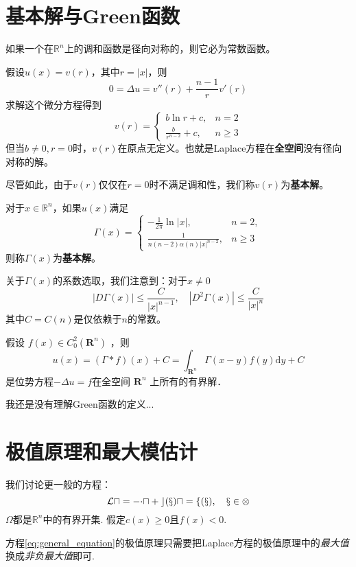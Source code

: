 \documentclass{mynote}
\begin{document}
\section{基本解与Green函数}

\begin{proposition}
    如果一个在$\mathbb{R}^n$上的调和函数是径向对称的，则它必为常数函数。
\end{proposition}
假设$u(x)=v(r)$，其中$r=|x|$，则
\[
    0=\Delta u =v''(r)+\frac{n-1}{r}v'(r)
\]
求解这个微分方程得到
\[
    v(r)=\left\{\begin{array}{cl}
        b \ln r+c, & n=2 \\
        \frac{b}{r^{n-2}}+c, & n \geq 3
        \end{array}\right.
\]
但当$b\ne 0,r=0$时，$v(r)$在原点无定义。也就是Laplace方程在\textbf{全空间}没有径向对称的解。

尽管如此，由于$v(r)$仅仅在$r=0$时不满足调和性，我们称$v(r)$为\textbf{基本解}。
\begin{definition}
    对于$x\in \mathbb{R}^n$，如果$u(x)$满足
    \[
        \Gamma(x)= \begin{cases}-\frac{1}{2 \pi} \ln |x|, & n=2, \\ \frac{1}{n(n-2) \alpha(n)|x|^{n-2}}, & n \geq 3\end{cases}
    \]
    则称$\Gamma(x)$为\textbf{基本解}。
\end{definition}
关于$\Gamma(x)$的系数选取，我们注意到：对于$x\ne 0$
\[
    |D \Gamma(x)| \leq \frac{C}{|x|^{n-1}}, \quad\left|D^2 \Gamma(x)\right| \leq \frac{C}{|x|^n}
\]
其中$C=C(n)$是仅依赖于$n$的常数。
\begin{theorem}
    假设 $f(x) \in C_0^2\left(\mathbf{R}^n\right)$ ，则
$$
u(x)=(\Gamma*f)(x)+C=\int_{\mathbf{R}^n} \Gamma(x-y) f(y) \mathrm{d} y+C
$$
是位势方程$-\Delta u=f$在全空间 $\mathbf{R}^n$ 上所有的有界解．
\end{theorem}

我还是没有理解Green函数的定义...

\section{极值原理和最大模估计}
我们讨论更一般的方程：
\begin{equation}\label{eq:general_equation}
    \cal{L}u=-\Delta u+c(x)u=f(x),\quad x\in \Omega
\end{equation}
$\Omega$都是$\mathbb{R}^n$中的有界开集. 假定$c(x)\ge 0$且$f(x)< 0$.

方程\ref{eq:general_equation}的极值原理只需要把Laplace方程的极值原理中的\textit{最大值}换成\textit{非负最大值}即可.
\end{document}
